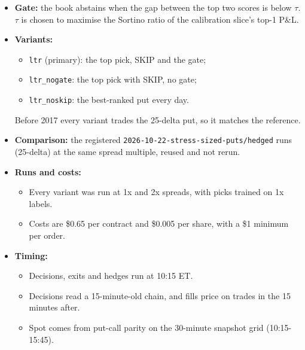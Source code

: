 \documentclass{article}
\begin{document}
\begin{itemize}
Each slice is purged so that no label overlaps the next.

\item \textbf{Gate:} the book abstains when the gap between the top two scores is below $\tau$. $\tau$ is chosen to maximise the Sortino ratio of the calibration slice's top-1 P\&L.

\item \textbf{Variants:}

\begin{itemize}

\item \texttt{ltr} (primary): the top pick, SKIP and the gate;

\item \texttt{ltr\_\allowbreak{}nogate}: the top pick with SKIP, no gate;

\item \texttt{ltr\_\allowbreak{}noskip}: the best-ranked put every day.

\end{itemize}

Before 2017 every variant trades the 25-delta put, so it matches the reference.

\item \textbf{Comparison:} the registered \texttt{2026-\allowbreak{}10-\allowbreak{}22-\allowbreak{}stress-\allowbreak{}sized-\allowbreak{}puts/\allowbreak{}hedged} runs (25-delta) at the same spread multiple, reused and not rerun.

\item \textbf{Runs and costs:}

\begin{itemize}

\item Every variant was run at 1x and 2x spreads, with picks trained on 1x labels.

\item Costs are \$0.65 per contract and \$0.005 per share, with a \$1 minimum per order.

\end{itemize}

\item \textbf{Timing:}

\begin{itemize}

\item Decisions, exits and hedges run at 10:15 ET.

\item Decisions read a 15-minute-old chain, and fills price on trades in the 15 minutes after.

\item Spot comes from put-call parity on the 30-minute snapshot grid (10:15-15:45).

\end{itemize}

\end{itemize}
\end{document}

